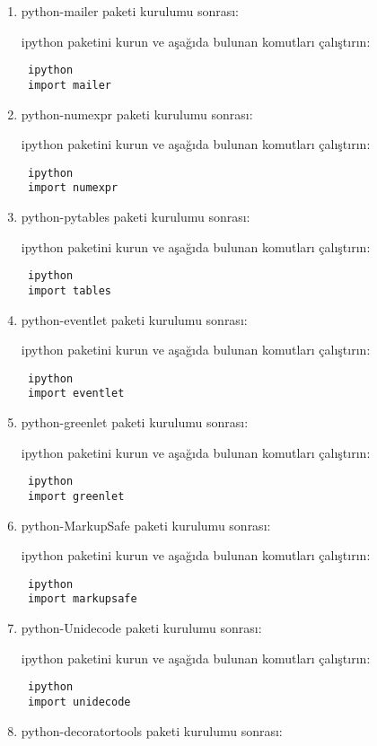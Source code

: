 \documentclass[a4paper,10pt]{article}
\begin{document}
\begin{enumerate}
\item python-mailer paketi kurulumu sonrası:

ipython paketini kurun ve aşağıda bulunan komutları çalıştırın:
\begin{verbatim}
 ipython
 import mailer
\end{verbatim}

\item python-numexpr paketi kurulumu sonrası:

ipython paketini kurun ve aşağıda bulunan komutları çalıştırın:
\begin{verbatim}
 ipython
 import numexpr
\end{verbatim}

\item python-pytables paketi kurulumu sonrası:

ipython paketini kurun ve aşağıda bulunan komutları çalıştırın:
\begin{verbatim}
 ipython
 import tables
\end{verbatim}

\item python-eventlet paketi kurulumu sonrası:

ipython paketini kurun ve aşağıda bulunan komutları çalıştırın:
\begin{verbatim}
 ipython
 import eventlet
\end{verbatim}

\item python-greenlet paketi kurulumu sonrası:

ipython paketini kurun ve aşağıda bulunan komutları çalıştırın:
\begin{verbatim}
 ipython
 import greenlet
\end{verbatim}

\item python-MarkupSafe paketi kurulumu sonrası:

ipython paketini kurun ve aşağıda bulunan komutları çalıştırın:
\begin{verbatim}
 ipython
 import markupsafe
\end{verbatim}

\item python-Unidecode paketi kurulumu sonrası:

ipython paketini kurun ve aşağıda bulunan komutları çalıştırın:
\begin{verbatim}
 ipython
 import unidecode
\end{verbatim}

\item python-decoratortools paketi kurulumu sonrası:


\end{enumerate}
\end{document}
